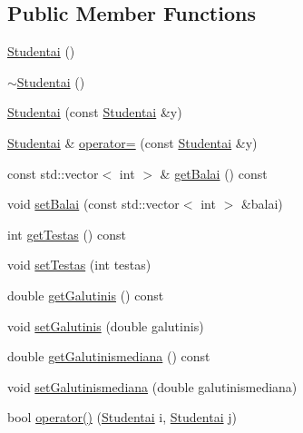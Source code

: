 \subsection*{Public Member Functions}
\begin{DoxyCompactItemize}
\item 
\mbox{\hyperlink{class_studentai_a8f53d55bca475d5bf1973f4f3c53f047}{Studentai}} ()
\item 
\mbox{\hyperlink{class_studentai_a10895815f551906aae4c2823bfd1bbc5}{$\sim$\+Studentai}} ()
\item 
\mbox{\hyperlink{class_studentai_abc23c366de25bc9cf76208ca2093aa30}{Studentai}} (const \mbox{\hyperlink{class_studentai}{Studentai}} \&y)
\item 
\mbox{\hyperlink{class_studentai}{Studentai}} \& \mbox{\hyperlink{class_studentai_a4e417cb00bc644821af2ccb5739ae1b5}{operator=}} (const \mbox{\hyperlink{class_studentai}{Studentai}} \&y)
\item 
const std\+::vector$<$ int $>$ \& \mbox{\hyperlink{class_studentai_a02288c042b8bda68ef6c39fbcce4bb18}{get\+Balai}} () const
\item 
void \mbox{\hyperlink{class_studentai_a5508e26d1f2cbb529d3d2a75f0fa84ff}{set\+Balai}} (const std\+::vector$<$ int $>$ \&balai)
\item 
int \mbox{\hyperlink{class_studentai_aa4d27e89ae686e193aeb3244fa2cd9f7}{get\+Testas}} () const
\item 
void \mbox{\hyperlink{class_studentai_abfe64d0425d89f99f1a90001ba4b6b0c}{set\+Testas}} (int testas)
\item 
double \mbox{\hyperlink{class_studentai_a36a34bd286edb0bb765088090ded5200}{get\+Galutinis}} () const
\item 
void \mbox{\hyperlink{class_studentai_a8cf46871b941c809c8527fc6dcacd407}{set\+Galutinis}} (double galutinis)
\item 
double \mbox{\hyperlink{class_studentai_a36d9d1fb2e90e101bd2b59b688cf6d19}{get\+Galutinismediana}} () const
\item 
void \mbox{\hyperlink{class_studentai_a5d3a8fbc9298bc924281c492f521eaae}{set\+Galutinismediana}} (double galutinismediana)
\item 
bool \mbox{\hyperlink{class_studentai_a66fe436a4c793728cd6b08f147a43806}{operator()}} (\mbox{\hyperlink{class_studentai}{Studentai}} i, \mbox{\hyperlink{class_studentai}{Studentai}} j)
\end{DoxyCompactItemize}
